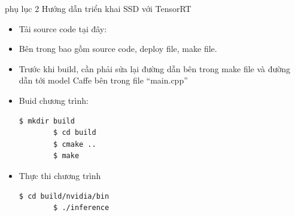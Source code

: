 \documentclass[a4paper]{report}
\begin{document}
phụ lục 2  Hướng dẫn triển khai SSD với TensorRT
\begin{itemize}
\item Tải source code tại đây:
\item Bên trong bao gồm source code, deploy file, make file.
\item Trước khi build, cần phải sửa lại đường dẫn bên trong make file và đường dẫn tới model Caffe bên trong file “main.cpp”
\item Buid chương trình:
	\begin{lstlisting}[language=bash, frame=single]
		$ mkdir build
		$ cd build
		$ cmake ..
		$ make
	\end{lstlisting}
\item Thực thi chương trình
	\begin{lstlisting}[language=bash, frame=single]
		$ cd build/nvidia/bin
		$ ./inference
	\end{lstlisting}
\end{itemize}
\end{document}
